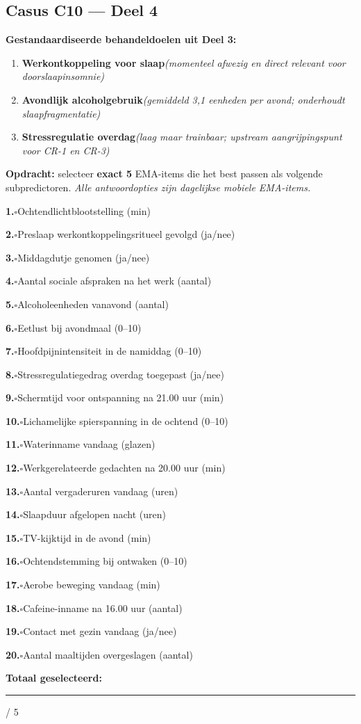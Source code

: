 \documentclass[11pt,a4paper]{article}
\newcommand{\checkitemBFS}[2]{%
\noindent\small\textbf{#1.}\hspace{0.45em}$\square$\hspace{0.4em}#2\par\vspace{0.20em}}
\begin{document}
\subsection*{Casus C10 --- Deel 4}

\begin{contextbox}
\small\textbf{Gestandaardiseerde behandeldoelen uit Deel 3:}
\begin{enumerate}[topsep=2pt,itemsep=1pt,label=\arabic*.]
\item \textbf{Werkontkoppeling voor slaap}\quad\textit{\small (momenteel afwezig en direct relevant voor doorslaapinsomnie)}
\item \textbf{Avondlijk alcoholgebruik}\quad\textit{\small (gemiddeld 3,1 eenheden per avond; onderhoudt slaapfragmentatie)}
\item \textbf{Stressregulatie overdag}\quad\textit{\small (laag maar trainbaar; upstream aangrijpingspunt voor CR-1 en CR-3)}
\end{enumerate}
\end{contextbox}

\begin{responsebox}
\small\textbf{Opdracht:} selecteer \textbf{exact 5} EMA-items die het best passen als volgende subpredictoren.
\textit{Alle antwoordopties zijn dagelijkse mobiele EMA-items.}

\checkitemBFS{1}{Ochtendlichtblootstelling (min)}
\checkitemBFS{2}{Preslaap werkontkoppelingsritueel gevolgd (ja/nee)}
\checkitemBFS{3}{Middagdutje genomen (ja/nee)}
\checkitemBFS{4}{Aantal sociale afspraken na het werk (aantal)}
\checkitemBFS{5}{Alcoholeenheden vanavond (aantal)}
\checkitemBFS{6}{Eetlust bij avondmaal (0--10)}
\checkitemBFS{7}{Hoofdpijnintensiteit in de namiddag (0--10)}
\checkitemBFS{8}{Stressregulatiegedrag overdag toegepast (ja/nee)}
\checkitemBFS{9}{Schermtijd voor ontspanning na 21.00 uur (min)}
\checkitemBFS{10}{Lichamelijke spierspanning in de ochtend (0--10)}
\checkitemBFS{11}{Waterinname vandaag (glazen)}
\checkitemBFS{12}{Werkgerelateerde gedachten na 20.00 uur (min)}
\checkitemBFS{13}{Aantal vergaderuren vandaag (uren)}
\checkitemBFS{14}{Slaapduur afgelopen nacht (uren)}
\checkitemBFS{15}{TV-kijktijd in de avond (min)}
\checkitemBFS{16}{Ochtendstemming bij ontwaken (0--10)}
\checkitemBFS{17}{Aerobe beweging vandaag (min)}
\checkitemBFS{18}{Cafeine-inname na 16.00 uur (aantal)}
\checkitemBFS{19}{Contact met gezin vandaag (ja/nee)}
\checkitemBFS{20}{Aantal maaltijden overgeslagen (aantal)}
\vspace{0.4em}
\noindent\textbf{Totaal geselecteerd:}\hspace{0.5em}\rule{1.2cm}{0.25pt}\hspace{0.2em}/ 5
\end{responsebox}
\end{document}

